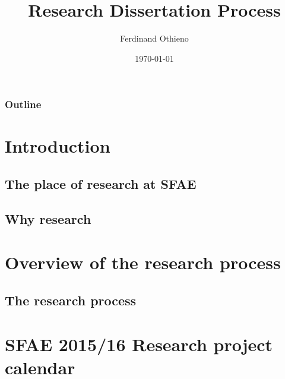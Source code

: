 \documentclass{beamer}
\title[Research Dissertation Process]{Research Dissertation Process } %
\author{Ferdinand Othieno} %
\institute[SFAE] %
{
Strathmore University \\ %
\medskip
\textit{fothieno@strathmore.edu} %
}
\date{\today } %
\begin{document}
\begin{frame}
\titlepage %
\end{frame}

\begin{frame}
\frametitle{Outline} %
\tableofcontents %
\end{frame}


\section{Introduction} %
\subsection{The place of research at SFAE}
\subsection{Why research}
\section{Overview of the research process}
\subsection{The research process}
\section{SFAE 2015/16 Research project calendar}
\end{document}
